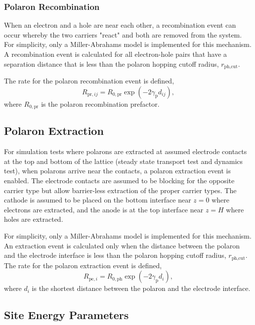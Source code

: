 \documentclass[%
 reprint,onecolumn,notitlepage,
superscriptaddress,longbibliography,
 amsmath,amssymb,
 aps,rmp,floatfix,
]{revtex4-1}
\begin{document}
\subsubsection{Polaron Recombination}

When an electron and a hole are near each other, a recombination event can occur whereby the two carriers "react" and both are removed from the system.
For simplicity, only a Miller-Abrahams model is implemented for this mechanism. 
A recombination event is calculated for all electron-hole pairs that have a separation distance that is less than the polaron hopping cutoff radius, $r_{\text{ph,cut}}$.

The rate for the polaron recombination event is defined,
$$R_{\text{pr},ij} = R_{0,\text{pr}} \exp{\left(- 2 \gamma_{\text{p}} d_{ij} \right)},$$
where $R_{0,\text{pr}}$ is the polaron recombination prefactor.

\subsection{Polaron Extraction}

For simulation tests where polarons are extracted at assumed electrode contacts at the top and bottom of the lattice (steady state transport test and dynamics test), when polarons arrive near the contacts, a polaron extraction event is enabled. 
The electrode contacts are assumed to be blocking for the opposite carrier type but allow barrier-less extraction of the proper carrier types.  
The cathode is assumed to be placed on the bottom interface near $z=0$ where electrons are extracted, and the anode is at the top interface near $z=H$ where holes are extracted.

For simplicity, only a Miller-Abrahams model is implemented for this mechanism. 
An extraction event is calculated only when the distance between the polaron and the electrode interface is less than the polaron hopping cutoff radius, $r_{\text{ph,cut}}$. The rate for the polaron extraction event is defined,
$$R_{\text{pe},i} = R_{0,\text{ph}} \exp{\left(- 2 \gamma_{\text{p}} d_{i} \right)},$$
where $d_{i}$ is the shortest distance between the polaron and the electrode interface.

\subsection{Site Energy Parameters}
\end{document}
